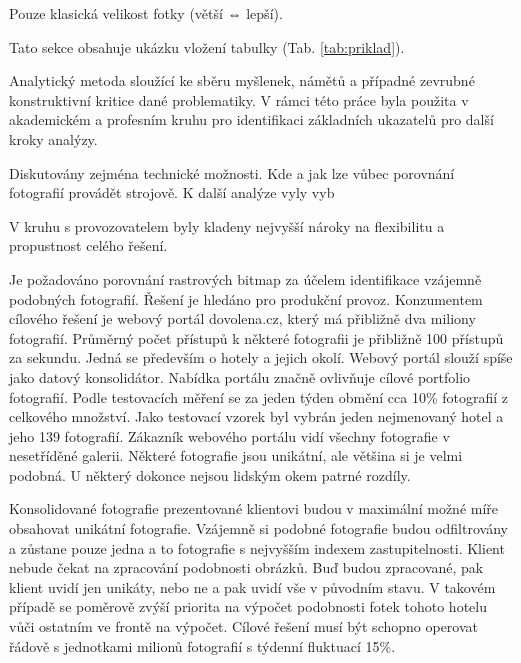 Pouze klasická velikost fotky (větší ⇔ lepší).


Tato sekce obsahuje ukázku vložení tabulky (Tab. \ref{tab:priklad}).





Analytický metoda sloužící ke sběru myšlenek, námětů a případné zevrubné konstruktivní kritice dané problematiky. V rámci této práce byla použita v akademickém a profesním kruhu pro identifikaci základních ukazatelů pro další kroky analýzy.

Diskutovány zejména technické možnosti. Kde a jak lze vůbec porovnání fotografií provádět strojově. K další analýze vyly vyb

V kruhu s provozovatelem byly kladeny nejvyšší nároky na flexibilitu a propustnost celého řešení.


Je požadováno porovnání rastrových bitmap za účelem identifikace vzájemně podobných fotografií. Řešení je hledáno pro produkční provoz. Konzumentem cílového řešení je webový portál dovolena.cz, který má přibližně dva miliony fotografií. Průměrný počet přístupů k některé fotografii je přibližně 100 přístupů za sekundu. Jedná se především o hotely a jejich okolí. Webový portál slouží spíše jako datový konsolidátor. Nabídka portálu značně ovlivňuje cílové portfolio fotografií. Podle testovacích měření se za jeden týden obmění cca 10\% fotografií z celkového množství. Jako testovací vzorek byl vybrán jeden nejmenovaný hotel a jeho 139 fotografií. Zákazník webového portálu vidí všechny fotografie v nesetříděné galerii. Některé fotografie jsou unikátní, ale většina si je velmi podobná. U některý dokonce nejsou lidským okem patrné rozdíly.

Konsolidované fotografie prezentované klientovi budou v maximální možné míře obsahovat unikátní fotografie. Vzájemně si podobné fotografie budou odfiltrovány a zůstane pouze jedna a to fotografie s nejvyšším indexem zastupitelnosti. Klient nebude čekat na zpracování podobnosti obrázků. Buď budou zpracované, pak klient uvidí jen unikáty, nebo ne a pak uvidí vše v původním stavu. V takovém případě se poměrově zvýší priorita na výpočet podobnosti fotek tohoto hotelu vůči ostatním ve frontě na výpočet. Cílové řešení musí být schopno operovat řádově s jednotkami milionů fotografií s týdenní fluktuací 15\%.

